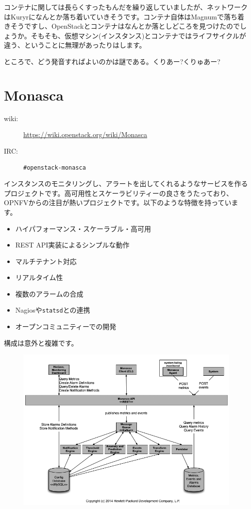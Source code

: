 コンテナに関しては長らくすったもんだを繰り返していましたが、ネットワークはKuryrになんとか落ち着いていきそうです。コンテナ自体はMagnumで落ち着きそうですし、OpenStackとコンテナはなんとか落としどころを見つけたのでしょうか。そもそも、仮想マシン(インスタンス)とコンテナではライフサイクルが違う、ということに無理があったりはします。

ところで、どう発音すればよいのかは謎である。くりあー?くりゅあー?

\section{Monasca}

\begin{description}
	\item[wiki:] \url{https://wiki.openstack.org/wiki/Monasca}
	\item[IRC:] \verb|#openstack-monasca|
\end{description}

インスタンスのモニタリングし、アラートを出してくれるようなサービスを作るプロジェクトです。高可用性とスケーラビリティーの良さをうたっており、OPNFVからの注目が熱いプロジェクトです。以下のような特徴を持っています。

\begin{itemize}
	\item ハイパフォーマンス・スケーラブル・高可用
	\item REST API実装によるシンプルな動作
	\item マルチテナント対応
	\item リアルタイム性
	\item 複数のアラームの合成
	\item Nagiosや\verb|statsd|との連携
	\item オープンコミュニティーでの開発
\end{itemize}

構成は意外と複雑です。

\begin{figure}[htb]
	\begin{center}
		\includegraphics[width=\textwidth]{img/Monasca-arch-component-diagram.png}
	\end{center}
\end{figure}

